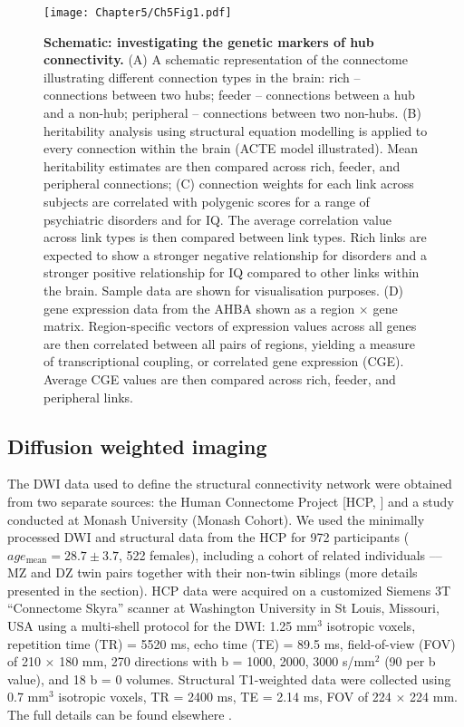 \begin{figure}[h!]
\begin{center}
\texttt{[image: Chapter5/Ch5Fig1.pdf]}%
\end{center}
\caption{\textbf{Schematic: investigating the genetic markers of hub connectivity.}
(A) A schematic representation of the connectome illustrating different connection types in the brain: rich – connections between two hubs; feeder – connections between a hub and a non-hub; peripheral – connections between two non-hubs. 
(B) heritability analysis using structural equation modelling is applied to every connection within the brain (ACTE model illustrated). Mean heritability estimates are then compared across rich, feeder, and peripheral connections; 
(C) connection weights for each link across subjects are correlated with polygenic scores for a range of psychiatric disorders and for IQ. The average correlation value across link types is then compared between link types. Rich links are expected to show a stronger negative relationship for disorders and a stronger positive relationship for IQ compared to other links within the brain. Sample data are shown for visualisation purposes. 
(D) gene expression data from the AHBA shown as a region $\times$ gene matrix. Region-specific vectors of expression values across all genes are then correlated between all pairs of regions, yielding a measure of transcriptional coupling, or correlated gene expression (CGE). Average CGE values are then compared across rich, feeder, and peripheral links.}
\label{fig:Ch5Fig1}
\end{figure}

\subsection*{Diffusion weighted imaging}
\label{sec:DWI}

The DWI data used to define the structural connectivity network were obtained from two separate sources: the Human Connectome Project [HCP, \citep{VanEssen2013}] and a study conducted at Monash University (Monash Cohort). We used the minimally processed DWI and structural data from the HCP for 972 participants ($age_\mathrm{mean} = 28.7 \pm 3.7$, 522 females), including a cohort of related individuals –-- MZ and DZ twin pairs together with their non-twin siblings (more details presented in the  section). HCP data were acquired on a customized Siemens 3T ``Connectome Skyra'' scanner at Washington University in St Louis, Missouri, USA using a multi‐shell protocol for the DWI: 1.25 mm$^{3}$ isotropic voxels, repetition time (TR) = 5520 ms, echo time (TE) = 89.5 ms,  field-of-view (FOV) of 210 $\times$ 180 mm, 270 directions with b = 1000, 2000, 3000 s/mm$^{2}$ (90 per b value), and 18 b = 0 volumes. Structural T1-weighted data were collected using 0.7 mm$^{3}$ isotropic voxels, TR = 2400 ms, TE = 2.14 ms, FOV of 224 $\times$ 224 mm. The full details can be found elsewhere \citep{Glasser2013}.

